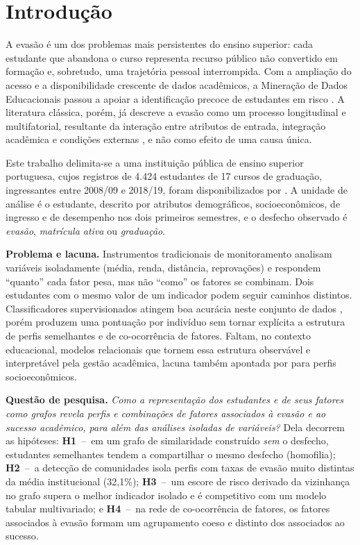 \section{Introdução}
\label{introducao}

A evasão é um dos problemas mais persistentes do ensino superior: cada estudante que abandona o curso representa recurso público não convertido em formação e, sobretudo, uma trajetória pessoal interrompida. Com a ampliação do acesso e a disponibilidade crescente de dados acadêmicos, a Mineração de Dados Educacionais passou a apoiar a identificação precoce de estudantes em risco \citep{romero2020}. A literatura clássica, porém, já descreve a evasão como um processo longitudinal e multifatorial, resultante da interação entre atributos de entrada, integração acadêmica e condições externas \citep{tinto1975}, e não como efeito de uma causa única.

Este trabalho delimita-se a uma instituição pública de ensino superior portuguesa, cujos registros de 4.424 estudantes de 17 cursos de graduação, ingressantes entre 2008/09 e 2018/19, foram disponibilizados por \citet{realinho2022}. A unidade de análise é o estudante, descrito por atributos demográficos, socioeconômicos, de ingresso e de desempenho nos dois primeiros semestres, e o desfecho observado é \textit{evasão}, \textit{matrícula ativa} ou \textit{graduação}.

\textbf{Problema e lacuna.} Instrumentos tradicionais de monitoramento analisam variáveis isoladamente (média, renda, distância, reprovações) e respondem ``quanto'' cada fator pesa, mas não ``como'' os fatores se combinam. Dois estudantes com o mesmo valor de um indicador podem seguir caminhos distintos. Classificadores supervisionados atingem boa acurácia neste conjunto de dados \citep{realinho2022}, porém produzem uma pontuação por indivíduo sem tornar explícita a estrutura de perfis semelhantes e de co-ocorrência de fatores. Faltam, no contexto educacional, modelos relacionais que tornem essa estrutura observável e interpretável pela gestão acadêmica, lacuna também apontada por \citet{porto2025} para perfis socioeconômicos.

\textbf{Questão de pesquisa.} \textit{Como a representação dos estudantes e de seus fatores como grafos revela perfis e combinações de fatores associados à evasão e ao sucesso acadêmico, para além das análises isoladas de variáveis?} Dela decorrem as hipóteses:
\textbf{H1}~--~em um grafo de similaridade construído \textit{sem} o desfecho, estudantes semelhantes tendem a compartilhar o mesmo desfecho (homofilia);
\textbf{H2}~--~a detecção de comunidades isola perfis com taxas de evasão muito distintas da média institucional (32{,}1\%);
\textbf{H3}~--~um escore de risco derivado da vizinhança no grafo supera o melhor indicador isolado e é competitivo com um modelo tabular multivariado; e
\textbf{H4}~--~na rede de co-ocorrência de fatores, os fatores associados à evasão formam um agrupamento coeso e distinto dos associados ao sucesso.

